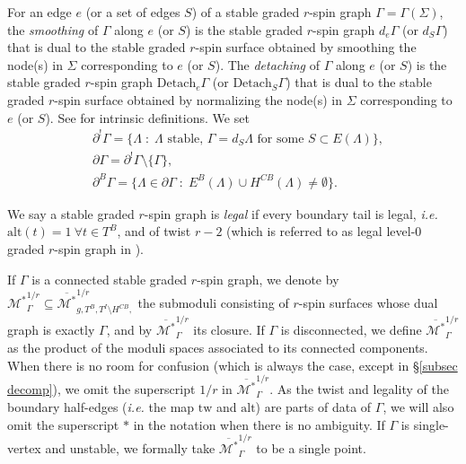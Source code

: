 \documentclass[11pt]{amsart}
\theoremstyle{definition}
\theoremstyle{remark}
\newcommand{\alt}{{\text{alt}}}
\newcommand{\tw}{\text{tw}}
\newcommand{\<}{\left<}
\renewcommand{\>}{\right>}
\numberwithin{equation}{section}
\def\Mbarstar{{\overline{\mathcal M^*}}}
\begin{document}
For an edge $e$ (or a set of edges $S$) of a stable graded $r$-spin graph $\Gamma=\Gamma(\Sigma)$,  the \textit{smoothing} of $\Gamma$ along $e$ (or $S$) is the stable graded $r$-spin graph $d_e\Gamma$ (or $d_S \Gamma$) that is dual to the stable graded $r$-spin surface obtained by smoothing the node(s) in $\Sigma$ corresponding to $e$ (or $S$). The \textit{detaching} of $\Gamma$ along $e$ (or $S$) is the stable graded $r$-spin graph $\text{Detach}_e\Gamma$ (or $\text{Detach}_S\Gamma$) that is dual to the stable graded $r$-spin surface obtained by normalizing the node(s) in $\Sigma$ corresponding to $e$ (or $S$). See \cite[\S 3.2]{TZ1} for intrinsic definitions. We set
\begin{align*}
&\partial^!\Gamma = \{\Lambda \; \colon \; \Lambda \text{ stable, }\Gamma= d_S\Lambda \text{ for some } S\subset E(\Lambda)\},\\
&\partial \Gamma = \partial^!\Gamma \setminus \{\Gamma\},\\
&\partial^B \Gamma = \{\Lambda \in \partial \Gamma \; \colon \; E^B(\Lambda) \cup H^{CB}(\Lambda) \neq \emptyset\}.
\end{align*}


We say a stable graded $r$-spin graph is \textit{legal} if every boundary tail is legal, \textit{i.e.} ${\text{alt}}(t)=1~\forall t \in T^B$, and of twist $r-2$ (which is referred to as legal level-$0$ graded $r$-spin graph in \cite{BCT2}). 

 If $\Gamma$ is a connected stable graded $r$-spin graph, we denote by %
${\mathcal M^*}_{\Gamma}^{1/r}\subseteq {\Mbarstar}_{g,  T^B, T^I\setminus H^{CB},}^{1/r}$ the %
submoduli consisting of $r$-spin surfaces whose dual graph is %
exactly $\Gamma$, and %
by $\overline{{\mathcal M^*}}_{\Gamma}^{1/r}$ its closure. If $\Gamma$ is disconnected, we define $\Mbarstar_{\Gamma}^{1/r}$ as the product of the moduli spaces associated to its connected components. When there is no room for confusion (which is always the case, except in \S \ref{subsec decomp}), we omit the superscript $1/r$ in $\overline{{\mathcal M^*}}_{\Gamma}^{1/r}$. 
 As the twist and legality of the boundary half-edges %
(\textit{i.e.} the %
map $\tw$ and $\alt$) are parts of data of $\Gamma$, we will also omit the superscript $*$ in the notation when there is no ambiguity.
 If $\Gamma$ is single-vertex and unstable, we formally take $\Mbarstar^{1/r}_{\Gamma}$ to be a single point.
\end{document}
